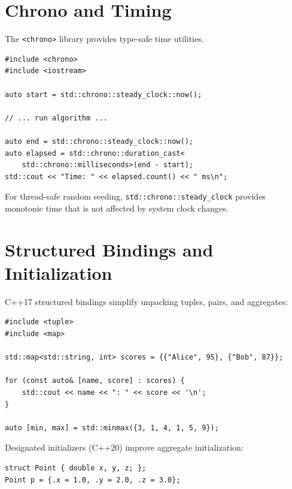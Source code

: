 \documentclass[twoside,12pt]{book}
\theoremstyle{plain}
\theoremstyle{definition}
\theoremstyle{remark}
\begin{document}
\section{Chrono and Timing}
\label{app:sec:chrono}

The \texttt{<chrono>} library provides type-safe time utilities.

\begin{lstlisting}[caption={Measuring execution time}]
#include <chrono>
#include <iostream>

auto start = std::chrono::steady_clock::now();

// ... run algorithm ...

auto end = std::chrono::steady_clock::now();
auto elapsed = std::chrono::duration_cast<
    std::chrono::milliseconds>(end - start);
std::cout << "Time: " << elapsed.count() << " ms\n";
\end{lstlisting}

For thread-safe random seeding, \texttt{std::chrono::steady\_clock}
provides monotonic time that is not affected by system clock changes.

\section{Structured Bindings and Initialization}
\label{app:sec:structured-bindings}

C++17 structured bindings simplify unpacking tuples, pairs, and
aggregates:

\begin{lstlisting}[caption={Structured bindings}]
#include <tuple>
#include <map>

std::map<std::string, int> scores = {{"Alice", 95}, {"Bob", 87}};

for (const auto& [name, score] : scores) {
    std::cout << name << ": " << score << '\n';
}

auto [min, max] = std::minmax({3, 1, 4, 1, 5, 9});
\end{lstlisting}

Designated initializers (C++20) improve aggregate initialization:

\begin{lstlisting}[caption={Designated initializers}]
struct Point { double x, y, z; };
Point p = {.x = 1.0, .y = 2.0, .z = 3.0};
\end{lstlisting}
\end{document}
